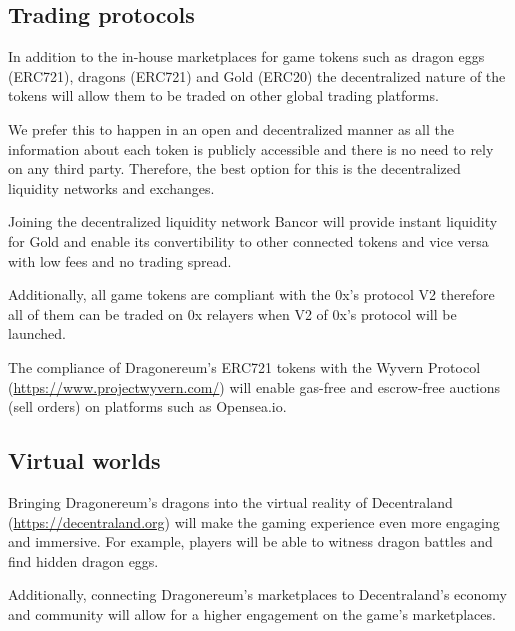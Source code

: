 \documentclass[12pt]{article}
\begin{document}
 \subsection{Trading protocols}\label{Trading protocols}\par

In addition to the in-house marketplaces for game tokens such as dragon eggs (ERC721), dragons (ERC721) and Gold (ERC20) the decentralized nature of the tokens will allow them to be traded on other global trading platforms.\par

We prefer this to happen in an open and decentralized manner as all the information about each token is publicly accessible and there is no need to rely on any third party. Therefore, the best option for this is the decentralized liquidity networks and exchanges.\par

Joining the decentralized liquidity network Bancor will provide instant liquidity for Gold and enable its convertibility to other connected tokens and vice versa with low fees and no trading spread.\par

Additionally, all game tokens are compliant with the 0x’s protocol V2 therefore all of them can be traded on 0x relayers when V2 of 0x’s protocol will be launched.\par

The compliance of Dragonereum’s ERC721 tokens with the Wyvern Protocol (\url{https://www.projectwyvern.com/}) will enable gas-free and escrow-free auctions (sell orders) on platforms such as Opensea.io.\par


\vspace{\baselineskip}
 \subsection{Virtual worlds}\label{Virtual worlds} \par

Bringing Dragonereum’s dragons into the virtual reality of Decentraland (\url{https://decentraland.org}) will make the gaming experience even more engaging and immersive. For example, players will be able to witness dragon battles and find hidden dragon eggs. \par

Additionally, connecting Dragonereum’s marketplaces to Decentraland’s economy and community will allow for a higher engagement on the game’s marketplaces.\par
\end{document}
